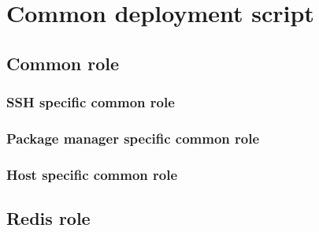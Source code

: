 \section{Common deployment script}\label{app:deploy3}






\subsection{Common role}



\subsubsection{SSH specific common role}


\subsubsection{Package manager specific common role}



\subsubsection{Host specific common role}








\subsection{Redis role}






